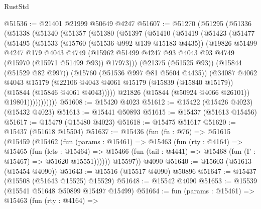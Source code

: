 \begin{lexlean}{RustStd}
\begin{coremodule}
@51536 := @21401 @21999 @50649 @4247
@51607 := @51270
    (@51295
      (@51336
        (@51338
          (@51340
            (@51357
              (@51380
                (@51397
                  (@51410
                    (@51419
                      (@51423
                        (@51477
                          (@51495
                            (@51533
                              (@15760 (@51536 @992 @139 @15183 @4435))
                              (@19826
                                @51499
                                @4247
                                @179
                                @4043
                                @4749
                                (@15962
                                  @51499
                                  @4247
                                  @93
                                  @4043
                                  @93
                                  @4749
                                  (@15970 (@15971 @51499 @93))
                                  @17973)))
                            (@21375 (@51525 @93))
                            (@15844 (@51529 @82 @997))
                            (@15760 (@51536 @997 @81 @5604 @4435))
                            (@34087
                              @4062
                              @4043
                              @15179
                              (@22106
                                @4043
                                @4061
                                @15179
                                (@15839 (@15840 @15179))
                                (@15844 (@15846 @4061 @4043)))))
                          @21826
                          (@15844 (@50924 @4066 @26101))
                          @19801)))))))))))
@51608 := @15420 @4023
@51612 := @15422 (@15426 @4023) (@15432 @4023)
@51613 := @15441 @50893
@51615 := @15437 (@51613 @15456)
@51617 := @15479 (@15480 @4023)
@51618 := @15475 @51617
@51620 := @15437 (@51618 @15504)
@51637 := @15436
    (fun (fn : @76) =>
    @51615
      (@15459
        (@15462
          (fun (params : @15461) =>
          @15463
            (fun (rty : @4164) =>
            @15465
              (fun (lets : @15464) =>
              @15466 (fun (tail : @4441) => @15468 (fun (Γ : @15467) => @51620 @15551))))))
        @15597))
    @4090
@51640 := @15603 (@51613 (@15454 @4090))
@51643 := @15516 (@15517 @4090) @50896
@51647 := @15437 (@15508 (@51643 @15525) @15529)
@51648 := @15542 @4090
@51653 := @15539 (@15541 @51648 @50899 @15497 @15499)
@51664 := fun (params : @15461) =>
  @15463
    (fun (rty : @4164) =>

\end{coremodule}
\end{lexlean}
